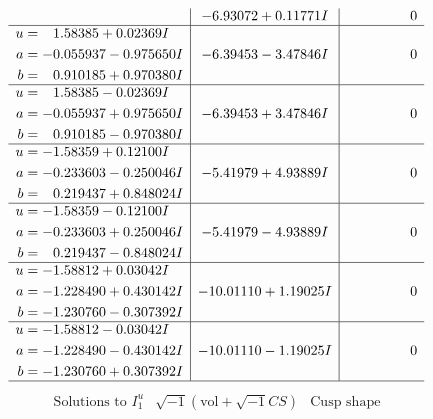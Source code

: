 \documentclass[1p]{elsarticle_modified}
\theoremstyle{definition}
\newcommand{\I}{\sqrt{-1}}
\begin{document}
$$\begin{array}{c|c|c}
 & -6.93072 + 0.11771 I & \phantom{-0.000000 } 0 \\ \hline\begin{aligned}
u &= \phantom{-}1.58385 + 0.02369 I \\
a &= -0.055937 - 0.975650 I \\
b &= \phantom{-}0.910185 + 0.970380 I\end{aligned}
 & -6.39453 - 3.47846 I & \phantom{-0.000000 } 0 \\ \hline\begin{aligned}
u &= \phantom{-}1.58385 - 0.02369 I \\
a &= -0.055937 + 0.975650 I \\
b &= \phantom{-}0.910185 - 0.970380 I\end{aligned}
 & -6.39453 + 3.47846 I & \phantom{-0.000000 } 0 \\ \hline\begin{aligned}
u &= -1.58359 + 0.12100 I \\
a &= -0.233603 - 0.250046 I \\
b &= \phantom{-}0.219437 + 0.848024 I\end{aligned}
 & -5.41979 + 4.93889 I & \phantom{-0.000000 } 0 \\ \hline\begin{aligned}
u &= -1.58359 - 0.12100 I \\
a &= -0.233603 + 0.250046 I \\
b &= \phantom{-}0.219437 - 0.848024 I\end{aligned}
 & -5.41979 - 4.93889 I & \phantom{-0.000000 } 0 \\ \hline\begin{aligned}
u &= -1.58812 + 0.03042 I \\
a &= -1.228490 + 0.430142 I \\
b &= -1.230760 - 0.307392 I\end{aligned}
 & -10.01110 + 1.19025 I & \phantom{-0.000000 } 0 \\ \hline\begin{aligned}
u &= -1.58812 - 0.03042 I \\
a &= -1.228490 - 0.430142 I \\
b &= -1.230760 + 0.307392 I\end{aligned}
 & -10.01110 - 1.19025 I & \phantom{-0.000000 } 0\\
 \hline 
 \end{array}$$\newpage$$\begin{array}{c|c|c}  
\text{Solutions to }I^u_{1}& \I (\text{vol} + \sqrt{-1}CS) & \text{Cusp shape}\\

\end{array}$$
\end{document}
